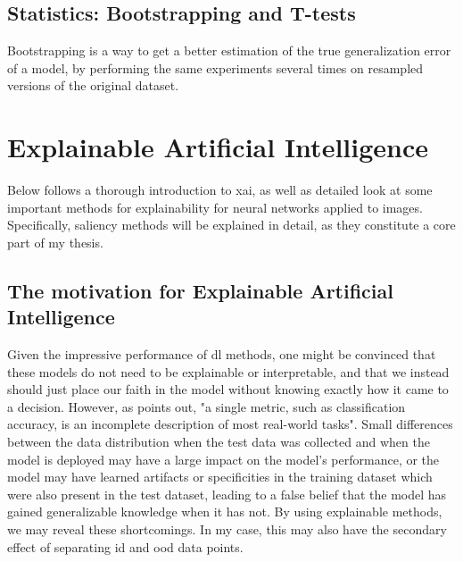 \documentclass[UKenglish]{uiomasterthesis} %
\theoremstyle{definition}
\begin{document}
\subsection{Statistics: Bootstrapping and T-tests}

Bootstrapping \cite{bootstrap} is a way to get a better estimation of the true generalization error of a model, by performing the same experiments several times on resampled versions of the original dataset.


\section{Explainable Artificial Intelligence} \label{chapter:xai}

Below follows a thorough introduction to \ac{xai}, as well as detailed look at some important methods for explainability for neural networks applied to images. Specifically, saliency methods will be explained in detail, as they constitute a core part of my thesis.

\subsection{The motivation for Explainable Artificial Intelligence}

Given the impressive performance of \ac{dl} methods, one might be convinced that these models do not need to be explainable or interpretable, and that we instead should just place our faith in the model without knowing exactly how it came to a decision. However, as \cite{doshivelez} points out, "a single metric, such as classification accuracy, is an incomplete description of most real-world tasks". Small differences between the data distribution when the test data was collected and when the model is deployed may have a large impact on the model's performance, or the model may have learned artifacts or specificities in the training dataset which were also present in the test dataset, leading to a false belief that the model has gained generalizable knowledge when it has not. By using explainable methods, we may reveal these shortcomings. In my case, this may also have the secondary effect of separating \ac{id} and \ac{ood} data points.
\end{document}
